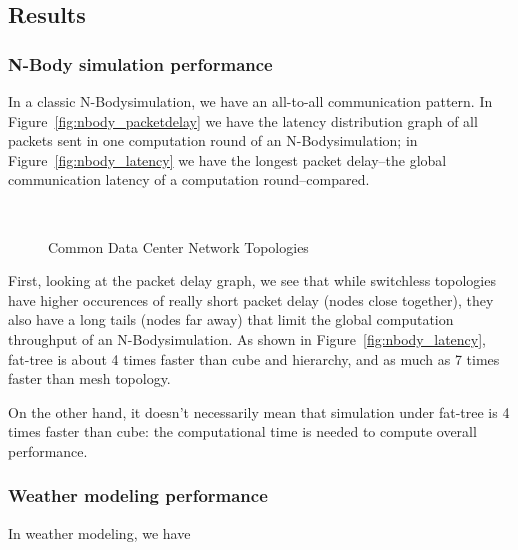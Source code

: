 \subsection {Results}


\subsubsection{N-Body simulation performance}
\newcommand{\nbody}{N-Body}
In a classic \nbody simulation, we have an all-to-all communication pattern. In Figure~\ref{fig:nbody_packetdelay} we have the latency distribution graph of all packets sent in one computation round of an \nbody simulation; in Figure~\ref{fig:nbody_latency} we have the longest packet delay--the global communication latency of a computation round--compared.

\captionsetup[subfloat]{captionskip=-0.003in}
\begin{figure}
    \centering
    \\
    \vspace{-0.1in}
    \vspace{-0.07in}
    \caption{Common Data Center Network Topologies}
    \label{fig:common_topos}
\end{figure}

First, looking at the packet delay graph, we see that while switchless topologies have higher occurences of really short packet delay (nodes close together), they also have a long tails (nodes far away) that limit the global computation throughput of an \nbody simulation. As shown in Figure~\ref{fig:nbody_latency}, fat-tree is about 4 times faster than cube and hierarchy, and as much as 7 times faster than mesh topology.

On the other hand, it doesn't necessarily mean that simulation under fat-tree is 4 times faster than cube: the computational time is needed to compute overall performance.

\subsubsection{Weather modeling performance}
In weather modeling, we have 